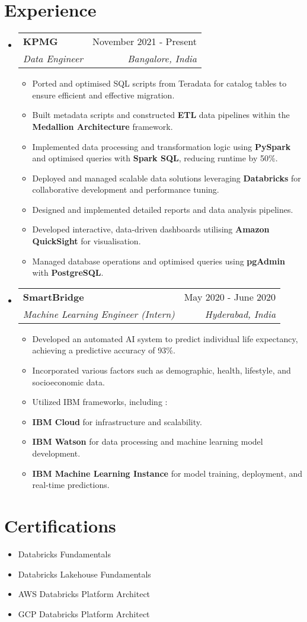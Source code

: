 \documentclass[letterpaper,11pt]{article}
\makeatletter
\newcommand{\resumeItem}[1]{
  \item\small{
    {#1 \vspace{-2pt}}
  }
}
\newcommand{\resumeSubheading}[4]{
  \vspace{-2pt}\item
    \begin{tabular*}{0.97\textwidth}[t]{l@{\extracolsep{\fill}}r}
      \textbf{#1} & #2 \\
      \textit{\small#3} & \textit{\small #4} \\
    \end{tabular*}\vspace{-7pt}
}
\newcommand{\resumeSubHeadingListStart}{\begin{itemize}[leftmargin=0.15in, label={}]}
\newcommand{\resumeSubHeadingListEnd}{\end{itemize}}
\newcommand{\resumeItemListStart}{\begin{itemize}}
\newcommand{\resumeItemListEnd}{\end{itemize}\vspace{-5pt}}
\makeatother
\begin{document}
\section{Experience}
  \resumeSubHeadingListStart
    \resumeSubheading
      {KPMG}{November 2021 - Present}
      {Data Engineer}{Bangalore, India}
      \resumeItemListStart
      \resumeItem{Ported and optimised SQL scripts from Teradata for catalog tables to ensure efficient and effective migration.}
      \resumeItem{Built metadata scripts and constructed \textbf{ETL} data pipelines within the \textbf{Medallion Architecture} framework.}
      \resumeItem{Implemented data processing and transformation logic using \textbf{PySpark} and optimised queries with \textbf{Spark SQL}, reducing runtime by 50\%.}
      \resumeItem{Deployed and managed scalable data solutions leveraging \textbf{Databricks} for collaborative development and performance tuning.}
      \resumeItemListEnd

      \resumeItemListStart
      \resumeItem{Designed and implemented detailed reports and data analysis pipelines.}
      \resumeItem{Developed interactive, data-driven dashboards utilising \textbf{Amazon QuickSight} for visualisation.}
      \resumeItem {Managed database operations and optimised queries using \textbf{pgAdmin} with \textbf{PostgreSQL}.}
      \resumeItemListEnd

    \resumeSubheading
      {SmartBridge}{May 2020 - June 2020}
      {Machine Learning Engineer (Intern)}{Hyderabad, India}
      \resumeItemListStart
      \resumeItem {Developed an automated AI system to predict individual life expectancy, achieving a predictive accuracy of 93\%.}
      \resumeItem {Incorporated various factors such as demographic, health, lifestyle, and socioeconomic data.}
      \resumeItem {Utilized IBM frameworks, including :}
      \resumeItem{\textbf{IBM Cloud} for infrastructure and scalability.}
      \resumeItem{\textbf{IBM Watson} for data processing and machine learning model development.}
      \resumeItem{\textbf{IBM Machine Learning Instance} for model training, deployment, and real-time predictions.}
      \resumeItemListEnd
  \resumeSubHeadingListEnd

\section{Certifications}
    \resumeItemListStart
    \resumeItem {Databricks Fundamentals}
    \resumeItem {Databricks Lakehouse Fundamentals}
    \resumeItem {AWS Databricks Platform Architect}
    \resumeItem {GCP Databricks Platform Architect}
    \resumeSubHeadingListEnd
\end{document}
